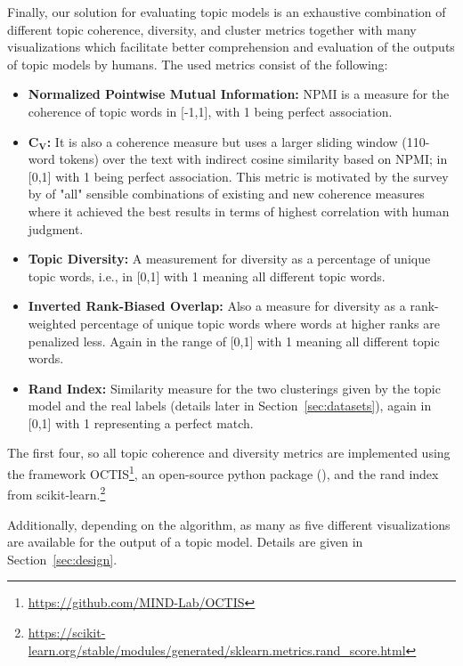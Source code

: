 \documentclass[11pt]{article}
\begin{document}
Finally, our solution for evaluating topic models is an exhaustive combination of different topic coherence, diversity, and cluster metrics together with many visualizations which facilitate better comprehension and evaluation of the outputs of topic models by humans. The used metrics consist of the following: 
\begin{itemize}
\item \textbf{Normalized Pointwise Mutual Information:} NPMI is a measure for the coherence of topic words in [-1,1], with 1 being perfect association.

\item \textbf{C${_\mathbf{V}}$:} It is also a coherence measure but uses a larger sliding window (110-word tokens) over the text with indirect cosine similarity based on NPMI; in [0,1] with 1 being perfect association. This metric is motivated by the survey by \citet{coherence_survey} of "all" sensible combinations of existing and new coherence measures where it achieved the best results in terms of highest correlation with human judgment. 

\item \textbf{Topic Diversity:} A measurement for diversity as a percentage of unique topic words, i.e., in [0,1] with 1 meaning all different topic words. 

\item \textbf{Inverted Rank-Biased Overlap:} Also a measure for diversity as a rank-weighted percentage of unique topic words where words at higher ranks are penalized less. Again in the range of [0,1] with 1 meaning all different topic words. 

\item \textbf{Rand Index:} Similarity measure for the two clusterings given by the topic model and the real labels (details later in Section~\ref{sec:datasets}), again in [0,1] with 1 representing a perfect match. 
\end{itemize}

The first four, so all topic coherence and diversity metrics are implemented using the framework OCTIS\footnote{\url{https://github.com/MIND-Lab/OCTIS}}, an open-source python package (\citealp{octis}), and the rand index from scikit-learn.\footnote{\url{https://scikit-learn.org/stable/modules/generated/sklearn.metrics.rand_score.html}}

Additionally, depending on the algorithm, as many as five different visualizations are available for the output of a topic model. Details are given in Section~\ref{sec:design}. 
\end{document}

